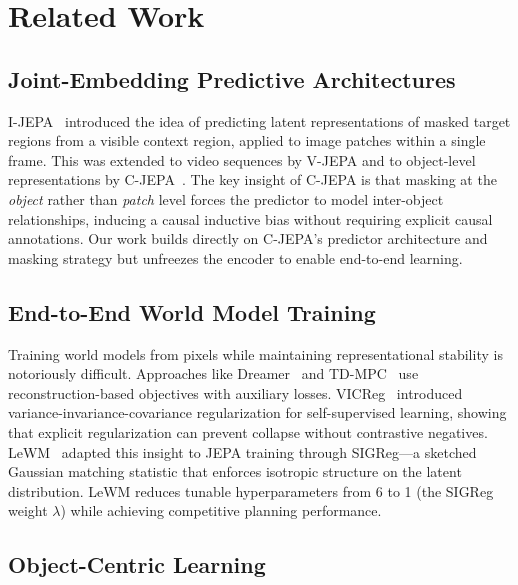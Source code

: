 \documentclass[12pt]{article}
\begin{document}
\section{Related Work}

\subsection{Joint-Embedding Predictive Architectures}

I-JEPA~\citep{assran2023ijepa} introduced the idea of predicting latent representations of masked target regions from a visible context region, applied to image patches within a single frame. This was extended to video sequences by V-JEPA and to object-level representations by C-JEPA~\citep{nam2026cjepa}. The key insight of C-JEPA is that masking at the \emph{object} rather than \emph{patch} level forces the predictor to model inter-object relationships, inducing a causal inductive bias without requiring explicit causal annotations. Our work builds directly on C-JEPA's predictor architecture and masking strategy but unfreezes the encoder to enable end-to-end learning.

\subsection{End-to-End World Model Training}

Training world models from pixels while maintaining representational stability is notoriously difficult. Approaches like Dreamer~\citep{hafner2023dreamerv3} and TD-MPC~\citep{hansen2022tdmpc} use reconstruction-based objectives with auxiliary losses. VICReg~\citep{bardes2022vicreg} introduced variance-invariance-covariance regularization for self-supervised learning, showing that explicit regularization can prevent collapse without contrastive negatives. LeWM~\citep{maes2026lewm} adapted this insight to JEPA training through SIGReg---a sketched Gaussian matching statistic that enforces isotropic structure on the latent distribution. LeWM reduces tunable hyperparameters from 6 to 1 (the SIGReg weight $\lambda$) while achieving competitive planning performance.

\subsection{Object-Centric Learning}
\end{document}
